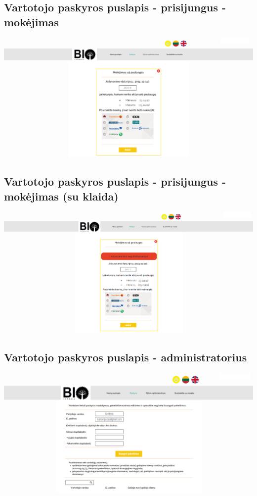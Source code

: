 \documentclass[a4paper,12pt]{article}
\begin{document}
\subsection{Vartotojo paskyros puslapis - prisijungus - mokėjimas}
\hspace{-2cm}
\includegraphics[scale=0.5]{interfeisai/paskyrosPuslapisVartotojasMokejimas}

\subsection{Vartotojo paskyros puslapis - prisijungus - mokėjimas (su klaida)}
\hspace{-2cm}
\includegraphics[scale=0.5]{interfeisai/paskyrosPuslapisVartotojasMokejimasSuKlaida}

\subsection{Vartotojo paskyros puslapis - administratorius}
\hspace{-2cm}
\includegraphics[scale=0.5]{interfeisai/paskyrosPuslapisAdministratorius}
\end{document}
